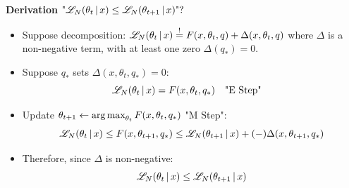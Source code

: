 \begin{frame} [t]
      {\bf Derivation}
    $ \text{"} 
        \mathscr {L} _{N} 
        ( \theta _{t} \,\vert\, x )
        \leq 
        \mathscr {L} _{N} 
        ( \theta _{t+1} \,\vert\, x )
        \text {"?} 
    $ 
\begin{itemize}
    \item 
        Suppose decomposition: 
        $ 
            \mathscr {L} _{N} 
            ( \theta _{t} \,\vert\, x ) 
        \overset {!} {=}
            F (x, \theta _{t}, q) 
            + \Delta (x, \theta _{t}, q)
        $ 
        where $\Delta$ is a non-negative
        term, with at least one zero 
        $ \Delta (q _{\ast}) = 0$. 
    \item 
        Suppose $q _{*}$ sets 
        $ \Delta (x, \theta _{t}, q _{*})
         = 0
        $:  
        {\small 
        $$ \like {N} 
           \conditional {\theta _{t}} {x}
         = F (x, \theta _{t}, q _{*}) 
           \qq {"E Step"}
        $$ 
        }
    \item 
        Update 
        $ \theta _{t+1} \leftarrow 
          \operatorname*{\textnormal{arg}\,\textnormal{max}} _{\theta _{t}}
          F (x, \theta _{t}, q_{*})
        $ "M Step": 
        {\small 
         \begin{gather*}
            \mathscr {L} _{N} 
            ( \theta _{t} \,\vert\, x )
          \leq 
            F (x, \theta_{t + 1}, q_{*}) 
          \leq 
            \mathscr {L} _{N} 
            ( \theta _{t+1} \,\vert\, x ) 
            + (-) 
            \Delta (x, \theta _{t + 1}, q _{*})
         \end{gather*}
        }
    \item 
        Therefore, since $\Delta$ is 
        non-negative: 
        { \small 
          $$ \mathscr {L} _{N} 
             ( \theta _{t} \,\vert\, x )
            \leq  
             \mathscr {L} _{N} 
             ( \theta _{t+1} \,\vert\, x )
          $$
        } 
\end{itemize}
\end{frame}


